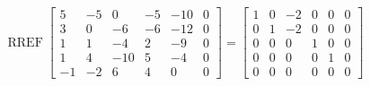 \begin{exerciseAnswer} 


\[\operatorname{RREF} \left[\begin{array}{ccccc|c}
5 & -5 & 0 & -5 & -10 & 0 \\
3 & 0 & -6 & -6 & -12 & 0 \\
1 & 1 & -4 & 2 & -9 & 0 \\
1 & 4 & -10 & 5 & -4 & 0 \\
-1 & -2 & 6 & 4 & 0 & 0
\end{array}\right] = \left[\begin{array}{ccccc|c}
1 & 0 & -2 & 0 & 0 & 0 \\
0 & 1 & -2 & 0 & 0 & 0 \\
0 & 0 & 0 & 1 & 0 & 0 \\
0 & 0 & 0 & 0 & 1 & 0 \\
0 & 0 & 0 & 0 & 0 & 0
\end{array}\right] \]



\end{exerciseAnswer}
